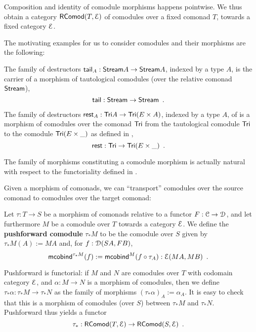 \documentclass[a4paper,USenglish]{lipics}
\newcommand{\fat}[1]{\textbf{#1}}
\begin{document}
\noindent
Composition and identity of comodule morphisms happens pointwise. We thus obtain a category $\RComod(T,\E)$
 of comodules
over a fixed comonad $T$, towards a fixed category $\E$.

The motivating examples for us to consider comodules and their morphisms are the following:

 \begin{ex}\label{ex_tail_comodule}
  The family of destructors $\stail_A : \stream A \to \stream A$, indexed by a type $A$, is the carrier of a morphism of tautological comodules (over the relative comonad $\stream$),
  \[ \stail : \stream \to \stream \enspace . \]
 \end{ex}

\begin{ex}\label{ex:tail_comodule}
 The family of destructors $\tail_A : \Tri A \to \Tri(E\times A)$, indexed by a type $A$, of  is a morphism of comodules over the comonad $\Tri$ 
  from the tautological comodule  $\Tri$ to the comodule $\Tri(E\times \_)$ as defined in ,
  \[ \tail : \Tri \to \Tri(E\times \_) \enspace . \]
\end{ex}




\begin{Long}
\begin{rem}
  The family of morphisms constituting a comodule morphism is actually natural with respect to the functoriality 
  defined in .
\end{rem}
\end{Long}

Given a morphism of comonads, we can \enquote{transport} comodules over the source comonad to comodules over the target comonad:


\begin{defn}
\label{def:pushforward_comodule} 
  Let $\tau : T\to S$ be a morphism of comonads relative to a functor $F : \C \to \D$, and let furthermore $M$ be a 
  comodule over $T$ towards a category $\E$. We define the \fat{pushforward comodule} $\tau_*M$ to be the comodule over $S$ given by
  $  \tau_*M(A) := MA $
  and, for $f : \D(SA,FB)$,
   \[ \mcobind^{\tau_*M}(f) := \mcobind^M(\comp{\tau_A}{f}) : \E(MA,MB) \enspace . \]
   
  \noindent
  Pushforward is functorial: if $M$ and $N$ are comodules over $T$ with codomain category $\E$, and $\alpha : M\to N$ is 
    a morphism of comodules, then we define 
     $\tau_*\alpha : \tau_*M \to \tau_*N$
    as the family of morphisms
     $ (\tau_*\alpha)_A := \alpha_A$.
  It is easy to check that this is a morphism of comodules (over $S$) between $\tau_*M$ and $\tau_*N$.
  Pushforward thus yields a functor \[\tau_*:\RComod(T,\E) \to \RComod(S,\E) \enspace . \]
\end{defn}
\end{document}
